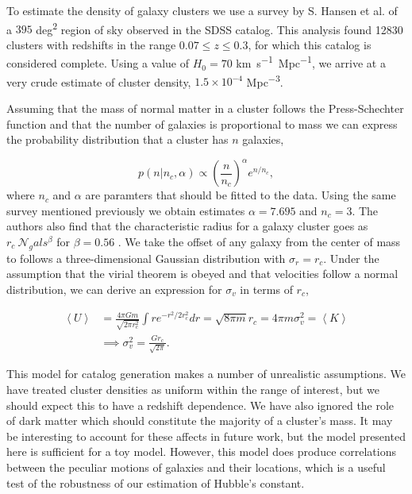 To estimate the density of galaxy clusters we use a survey by S. Hansen et al. of a $395$ \si{deg^2} region of sky observed in the SDSS catalog. This analysis found 12830 clusters with redshifts in the range $0.07\leq z\leq 0.3$, for which this catalog is considered complete. Using a value of $H_0=70$ \si{km.s^{-1}.Mpc^{-1}}, we arrive at a very crude estimate of cluster density, $1.5\times 10^{-4}$ \si{Mpc^{-3}}.

Assuming that the mass of normal matter in a cluster follows the Press-Schechter function \cite{Press_1974} and that the number of galaxies is proportional to mass we can express the probability distribution that a cluster has $n$ galaxies,

\begin{equation}
p(n | n_c, \alpha) \propto \left( \frac{n}{n_c} \right)^{\alpha}e^{n/n_c},
\end{equation}
where $n_c$ and $\alpha$ are paramters that should be fitted to the data. Using the same survey mentioned previously we obtain estimates $\alpha = 7.695$ and $n_c = 3$. The authors also find that the characteristic radius for a galaxy cluster goes as $r_c ~ \mathcal{N}_gals^\beta$ for $\beta=0.56$ \cite{Hansen_2005}. We take the offset of any galaxy from the center of mass to follows a three-dimensional Gaussian distribution with $\sigma_r = r_c$. Under the assumption that the virial theorem is obeyed and that velocities follow a normal distribution, we can derive an expression for $\sigma_v$ in terms of $r_c$,

\begin{align}
  \left<U\right> &= \frac{4\pi Gm}{\sqrt{2\pi r_c^2}} \int r e^{-r^2 / 2r_c^2} dr = \sqrt{8\pi m}r_c = 4\pi m\sigma_v^2 = \left<K\right> \nonumber\\
  &\implies \sigma_v^2 = \frac{G r_c}{\sqrt{2\pi}}.
\end{align}

This model for catalog generation makes a number of unrealistic assumptions. We have treated cluster densities as uniform within the range of interest, but we should expect this to have a redshift dependence. We have also ignored the role of dark matter which should constitute the majority of a cluster's mass. It may be interesting to account for these affects in future work, but the model presented here is sufficient for a toy model. However, this model does produce correlations between the peculiar motions of galaxies and their locations, which is a useful test of the robustness of our estimation of Hubble's constant.

